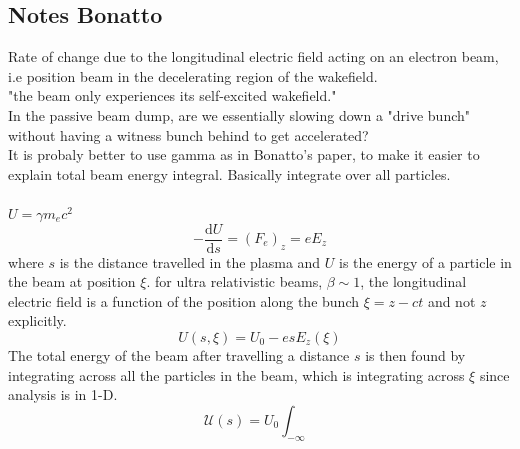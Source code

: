 \documentclass[%
onecolumn, notitlepage,
 amsmath,amssymb,
 aps,
]{article}
\begin{document}
\subsection{Notes Bonatto}
Rate of change due to the longitudinal electric field acting on an electron beam, i.e position beam in the decelerating region of the wakefield.\\
"the beam only experiences its self-excited wakefield."\\
In the passive beam dump, are we essentially slowing down a "drive bunch" without having a witness bunch behind to get accelerated?\\
It is probaly better to use gamma as in Bonatto's paper, to make it easier to explain total beam energy integral. Basically integrate over all particles.\\
\\
$U=\gamma m_ec^2$
\begin{equation}
-\frac{\mathrm{d}U}{\mathrm{d}s}=(F_e)_z=eE_z
\end{equation}
where $s$ is the distance travelled in the plasma and $U$ is the energy of a particle in the beam at position $\xi$. 
for ultra relativistic beams, $\beta\sim 1$, the longitudinal electric field is a function of the position along the bunch $\xi=z-ct$ and not $z$ explicitly. 
\begin{equation}
U(s,\xi)=U_0-esE_z(\xi)
\end{equation}
The total energy of the beam after travelling a distance $s$ is then found by integrating across all the particles in the beam, which is integrating across $\xi$ since analysis is in 1-D.
\begin{equation}
\mathcal{U}(s)=U_0\int_{-\infty}
\end{equation}
\end{document}
